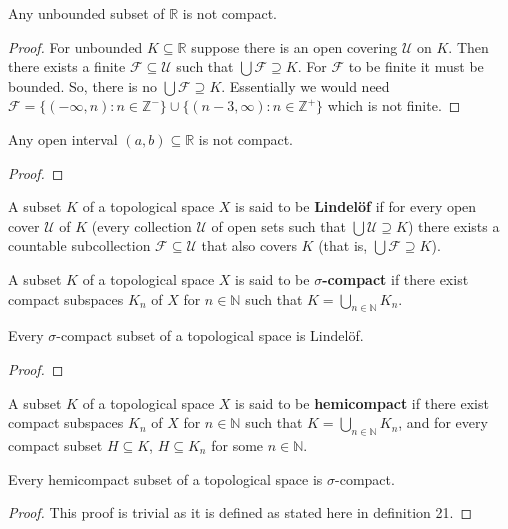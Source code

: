 \documentclass{article}
\begin{document}
	\begin{proposition}
	  Any unbounded subset of \(\mathbb R\) is not compact.
	\end{proposition}
	\begin{proof}
	For unbounded $K \subseteq \mathbb{R}$ suppose there is an open covering $\mathcal{U}$ on $K$. Then there exists a finite $\mathcal{F} \subseteq \mathcal{U}$ such that $\bigcup \mathcal{F} \supseteq K$. For $\mathcal{F}$ to be finite it must be bounded. So, there is no $\bigcup \mathcal{F} \supseteq K$. Essentially we would need $\mathcal{F} = \lbrace (- \infty , n) : n \in \mathbb{Z^-} \rbrace \cup \lbrace (n-3, \infty) : n \in \mathbb{Z^+} \rbrace$ which is not finite.
	\end{proof}	

	\begin{proposition}
	  Any open interval \((a,b)\subseteq\mathbb R\) is not compact.
	\end{proposition}
	\begin{proof}
	\end{proof}


	\begin{definition}
	  A subset \(K\) of a topological space \(X\) is said to be \textbf{Lindel\"of} if for every
	  open cover \(\mathcal U\) of \(K\) (every collection \(\mathcal U\) of open sets
	  such that \(\bigcup \mathcal U\supseteq K\)) there exists a countable subcollection
	  \(\mathcal F\subseteq \mathcal U\) that also covers \(K\) (that is,
	  \(\bigcup\mathcal F\supseteq K\)).
	\end{definition}

	\begin{definition}
	  A subset \(K\) of a topological space \(X\) is said to be \textbf{\(\sigma\)-compact} if
	  there exist compact subspaces \(K_n\) of \(X\) for \(n\in\mathbb N\) such that
	  \(K=\bigcup_{n\in\mathbb N} K_n\).
	\end{definition}

	\begin{theorem}
		Every \(\sigma\)-compact subset of a topological space is Lindel\"of.
	\end{theorem}
	\begin{proof}
	\end{proof}


	\begin{definition}
	  A subset \(K\) of a topological space \(X\) is said to be \textbf{hemicompact} if
	  there exist compact subspaces \(K_n\) of \(X\) for \(n\in\mathbb N\) such that
	  \(K=\bigcup_{n\in\mathbb N} K_n\), and for every compact subset \(H\subseteq K\),
	  \(H\subseteq K_n\) for some \(n\in\mathbb N\).
	\end{definition}

	\begin{theorem}
		Every hemicompact subset of a topological space is \(\sigma\)-compact.
	\end{theorem}
	\begin{proof}
		This proof is trivial as it is defined as stated here in definition 21.
	\end{proof}
\end{document}
